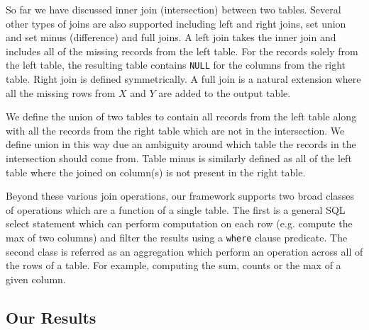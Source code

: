 So far we have discussed inner join (intersection) between two tables. Several other types of joins are also supported including left and right joins, set union and set minus (difference) and full joins. A left join takes the inner join and includes all of the missing records from the left table. For the records solely from the left table, the resulting table contains \texttt{NULL} for the columns from the right table. Right join is defined symmetrically. A full join is a natural extension where all the missing rows from $X$ and $Y$ are added to the output table.

We define the union of two tables to contain all records from the left table along with all the records from the right table which are not in the intersection. We define union in this way due an ambiguity around which table the records in the intersection should come from. Table minus is similarly defined as all of the left table where the joined on column(s) is not present in the right table. 

Beyond these various join operations, our framework supports two broad classes of operations which are a function of a single table. The first is a general SQL select statement which can perform computation on each row (e.g. compute the max of two columns) and filter the results using a \texttt{where} clause predicate. The second class is referred as an aggregation which perform an operation across all of the rows of a table. For example, computing the sum, counts or the max of a given column. 



\subsection{Our Results}


